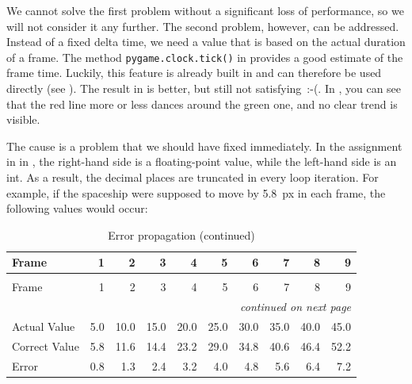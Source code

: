 We cannot solve the first problem without a significant loss of performance, so we will not consider it any further. The second problem, however, can be addressed. Instead of a fixed delta time, we need a value that is based on the actual duration of a frame. The method \texttt{pygame.clock.tick()} in  provides a good estimate of the frame time. Luckily, this feature is already built in and can therefore be used directly (see ). The result in  is better, but still not satisfying~{:-(}. In , you can see that the red line more or less dances around the green one, and no clear trend is visible.



The cause is a problem that we should have fixed immediately. In the assignment in  in , the right-hand side is a floating-point value, while the left-hand side is an \gls{int}. As a result, the decimal places are truncated in every loop iteration. For example, if the spaceship were supposed to move by \SI{5.8}{px} in each frame, the following values would occur:

\begin{longtable}{lrrrrrrrrr}
	\caption{Error propagation}\label{tabFpsBewegung04} \\
	\toprule
    Frame & 1 & 2 & 3 & 4 & 5 & 6 & 7 & 8 & 9 \\
	\midrule
	\endfirsthead %
	
	\caption{Error propagation (continued)}\\
	\toprule
    Frame & 1 & 2 & 3 & 4 & 5 & 6 & 7 & 8 & 9 \\
	\midrule
	\endhead %

	\midrule
	\multicolumn{10}{r}{\emph{continued on next page}} \\
	\endfoot
	
	\bottomrule
	\endlastfoot
	Actual Value  & 5.0 & 10.0 & 15.0 & 20.0 & 25.0 & 30.0 & 35.0 & 40.0 & 45.0 \\
	Correct Value & 5.8 & 11.6 & 14.4 & 23.2 & 29.0 & 34.8 & 40.6 & 46.4 & 52.2 \\
	Error         & 0.8 &  1.3 &  2.4 &  3.2 &  4.0 &  4.8 &  5.6 &  6.4 &  7.2 \\
\end{longtable} 

